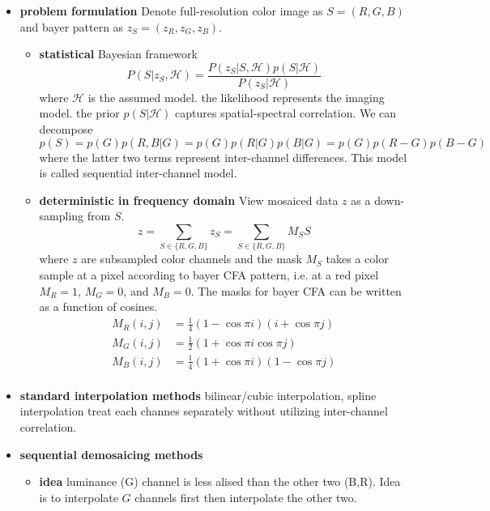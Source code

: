 \documentclass[11pt]{article}
\begin{document}
\begin{itemize}
    \item \textbf{problem formulation} Denote full-resolution color image as $S=(R,G,B)$ and bayer pattern as $z_S = (z_R, z_G, z_B)$. 
    \begin{itemize}
        \item \textbf{statistical} Bayesian framework
        \[
            P(S|z_S, \mathcal{H}) = 
            \frac{
                P(z_S | S, \mathcal{H}) p(S|\mathcal{H})
            }{
                P(z_S | \mathcal{H})
            }
        \]
        where $\mathcal{H}$ is the assumed model. the likelihood represents the imaging model. the prior $p(S|\mathcal{H})$ captures spatial-spectral correlation. We can decompose
        \[
            p(S) = p(G) p(R,B | G)
            = p(G) p(R|G) p(B|G)
            = p(G) p(R-G) p(B-G)
        \]
        where the latter two terms represent inter-channel differences. This model is called sequential inter-channel model.
        \item \textbf{deterministic in frequency domain} View mosaiced data $z$ as a down-sampling from $S$.
        \[
            z = \sum_{S\in\{R,G,B\}} z_S = \sum_{S\in \{R,G,B\}} M_S S
        \]
        where $z$ are subsampled color channels and the mask $M_S$ takes a color sample at a pixel according to bayer CFA pattern, i.e. at a red pixel $M_R = 1$, $M_G = 0$, and $M_B = 0$. The masks for bayer CFA can be written as a function of cosines.
        \begin{align*}
            M_R(i,j) &= \frac{1}{4} (1-\cos{\pi i}) (i+\cos{\pi j}) \\
            M_G(i,j) &= \frac{1}{2} (1 + \cos{\pi i} \cos{\pi j}) \\
            M_B(i, j) &= \frac{1}{4} (1 + \cos{\pi i})(1 - \cos{\pi j}) \\ 
        \end{align*}
    \end{itemize}
    \item \textbf{standard interpolation methods} bilinear/cubic interpolation, spline interpolation treat each channes separately without utilizing inter-channel correlation.
    \item \textbf{sequential demosaicing methods} 
    \begin{itemize}
        \item \textbf{idea} luminance (G) channel is less alised than the other two (B,R). Idea is to interpolate $G$ channels first then interpolate the other two.

\end{itemize}
\end{itemize}
\end{document}
